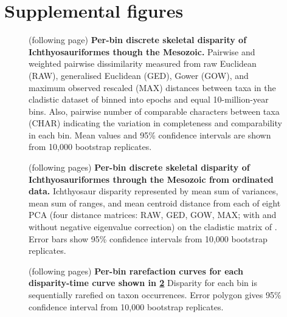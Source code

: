 \documentclass[british,a4paper]{article}
\makeatletter
\renewcommand\listoffigures{%
	    \@starttoc{lof}%
    }
\makeatother
\begin{document}
\section{Supplemental figures}\label{sec:supplemental-figures}

\listoffigures

\begin{figure}[h]
    \caption[Per-bin discrete skeletal disparity of Ichthyosauriformes though the Mesozoic]{(following page) \textbf{Per-bin discrete skeletal disparity of Ichthyosauriformes though the Mesozoic.} Pairwise and weighted pairwise dissimilarity measured from raw Euclidean (RAW), generalised Euclidean (GED), Gower (GOW), and maximum observed rescaled (MAX) distances between taxa in the cladistic dataset of \textcite{Moon2019a} binned into epochs and equal 10-million-year bins. Also, pairwise number of comparable characters between taxa (CHAR) indicating the variation in completeness and comparability in each bin. Mean values and 95\% confidence intervals are shown from 10,000 bootstrap replicates.\label{fig:pairwise-disparity}} 
\end{figure} \FloatBarrier


\FloatBarrier

\begin{figure}[h]
    \caption[Per-bin discrete skeletal disparity of Ichthyosauriformes through the Mesozoic from ordinated data]{(following pages) \textbf{Per-bin discrete skeletal disparity of Ichthyosauriformes through the Mesozoic from ordinated data.} Ichthyosaur disparity represented by mean sum of variances, mean sum of ranges, and mean centroid distance from each of eight PCA (four distance matrices: RAW, GED, GOW, MAX; with and without negative eigenvalue correction) on the cladistic matrix of \textcite{Moon2019a}. Error bars show 95\% confidence intervals from 10,000 bootstrap replicates.\label{fig:ordinated-disparity}}
\end{figure}
\FloatBarrier


\FloatBarrier

\begin{figure}[h]
    \caption[Per-bin rarefaction curves for each disparity-time curve shown in \cref{fig:ordinated-disparity}]{(following pages) \textbf{Per-bin rarefaction curves for each disparity-time curve shown in \cref{fig:ordinated-disparity}} Disparity for each bin is sequentially rarefied on taxon occurrences. Error polygon gives 95\% confidence interval from 10,000 bootstrap replicates.\label{fig:rarefaction-curves}}
\end{figure}
\FloatBarrier
\end{document}
